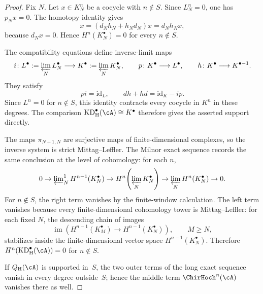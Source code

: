 \begin{proof}
Fix \(N\). Let \(x\in K_N^n\) be a cocycle with \(n\notin S\).  Since
\(L_N^n=0\), one has $p_Nx=0$.  The homotopy identity gives
\[
 x=(d_Nh_N+h_Nd_N)x=d_Nh_Nx,
\]
because \(d_Nx=0\). Hence \(H^n(K_N^\bullet)=0\) for every
\(n\notin S\).

The compatibility equations define inverse-limit maps
\[
 i\colon L^\bullet:=\varprojlim_N L_N^\bullet
 \longrightarrow K^\bullet:=\varprojlim_N K_N^\bullet,
 \qquad
 p\colon K^\bullet\longrightarrow L^\bullet,
 \qquad
 h\colon K^\bullet\longrightarrow K^{\bullet-1}.
\]
They satisfy
\[
 pi=\mathrm{id}_{L},
 \qquad
 dh+hd=\mathrm{id}_{K}-ip.
\]
Since $L^n=0$ for $n\notin S$, this identity contracts every cocycle
in $K^n$ in these degrees.  The comparison
$\mathrm{KD}_{\mathrm H}^{\bullet}(\cA)\cong K^\bullet$ therefore
gives the asserted support directly.

The maps $\pi_{N+1,N}$ are surjective maps of finite-dimensional
complexes, so the inverse system is strict Mittag--Leffler. The Milnor
exact sequence records the same conclusion at the level of
cohomology: for
each \(n\),
\[
 0\to
 \varprojlim\nolimits^1_N H^{n-1}(K_N^\bullet)
 \to
 H^n\!\left(\varprojlim_N K_N^\bullet\right)
 \to
 \varprojlim_N H^n(K_N^\bullet)
 \to 0.
\]
For \(n\notin S\), the right term vanishes by the finite-window
calculation.  The left term vanishes because every finite-dimensional
cohomology tower is Mittag--Leffler: for each fixed \(N\), the
descending chain of images
\[
 \operatorname{im}\!\left(H^{n-1}(K_M^\bullet)
 \to H^{n-1}(K_N^\bullet)\right),
 \qquad M\geq N,
\]
stabilizes inside the finite-dimensional vector space
\(H^{n-1}(K_N^\bullet)\). Therefore
\(H^n(\mathrm{KD}_{\mathrm H}^{\bullet}(\cA))=0\) for
\(n\notin S\).

If $Q_{\mathrm H}(\cA)$ is supported in~$S$, the two outer terms of
the long exact sequence vanish in every degree outside~$S$; hence the
middle term $\ChirHoch^n(\cA)$ vanishes there as well.
\end{proof}


